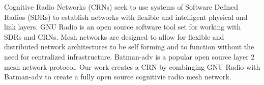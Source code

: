 Cognitive Radio Networks (CRNs) seek to use systems of Software Defined Radios (SDRs) to establish
networks with flexible and intelligent physical and link layers. GNU Radio is an open source software
tool set for working with SDRs and CRNs.  Mesh networks are designed to allow for flexible and 
distributed network architectures to be self forming and to function without
the need for centralized infrastructure. Batman-adv is a popular open source layer 2 mesh network
protocol. Our work creates a CRN by combinging GNU Radio with Batman-adv to create a fully open
source cognitivie radio mesh network. 

